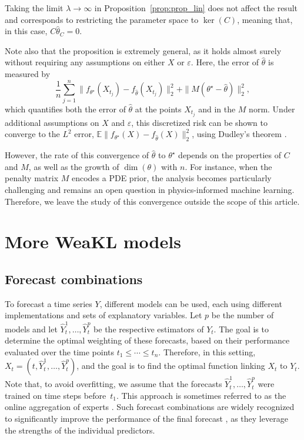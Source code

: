 \begin{remark}
\label{rem:comment_prop_lin}
    Taking the limit $\lambda \to \infty$ in Proposition~\ref{prop:prop_lin} does not affect the result and corresponds to restricting the parameter space to $\ker(C)$, meaning that, in this case, $C \hat \theta_C = 0$.
    
Note also that the proposition is extremely general, as it holds almost surely without requiring any assumptions on either $X$ or $\varepsilon$.
Here, the error of $\hat \theta$ is measured by 
\[\frac{1}{n}\sum_{j=1}^n\| f_{\theta^\star}(X_{t_j}) - f_{ \hat \theta}(X_{t_j})\|_2^2 + \|M(\theta^\star- \hat \theta)\|_2^2,\]
which quantifies both the error of $\hat \theta$ at the points $X_{t_j}$ and in the $M$ norm.
Under additional assumptions on $X$ and $\varepsilon$, this discretized risk can be shown to converge to the $L^2$ error, $\mathbb E\| f_{\theta^\star}(X) - f_{ \hat \theta}(X)\|_2^2$, using Dudley’s theorem \citep[see, e.g., Theorem~5.2 in the Supplementary Material of][]{doumeche2023convergence}.

However, the rate of this convergence of $\hat \theta$ to $\theta^\star$ depends on the properties of $C$ and $M$, as well as the growth of $\dim(\theta)$ with $n$.
For instance, when the penalty matrix $M$ encodes a PDE prior, the analysis becomes particularly challenging and remains an open question in physics-informed machine learning.
Therefore, we leave the study of this convergence outside the scope of this article.
\end{remark}

\section{More WeaKL models}
\subsection{Forecast combinations}
\label{sec:combination}
To forecast a time series $Y$, different models can be used, each using different implementations and sets of explanatory variables. Let $p$ be the number of models and let $\hat{Y}^1_t, \ldots, \hat{Y}^p_t$ be the respective estimators of $Y_t$.
The goal is to determine the optimal weighting of these forecasts, based on their performance evaluated over the time points $t_1 \leq  \cdots \leq t_n$. 
Therefore, in this setting, $X_t = (t, \hat{Y}^1_t, \ldots, \hat{Y}^p_t)$, and the goal is to find the optimal function linking $X_t$ to $Y_t$.
Note that, to avoid overfitting, we assume that the forecasts $\hat{Y}^1_t, \ldots, \hat{Y}^p_t$ were trained on time steps before~$t_1$.
This approach is sometimes referred to as the online aggregation of experts \citep{Remlinger2023expert, Antoniadis2024Aggregation}. Such forecast combinations are widely recognized to significantly improve the performance of the final forecast \citep{timmermann2006handbook, vilmarest2022state,petropoulos2022forecasting, amara-ouali2024forecasting}, as they leverage the strengths of the individual predictors. 

